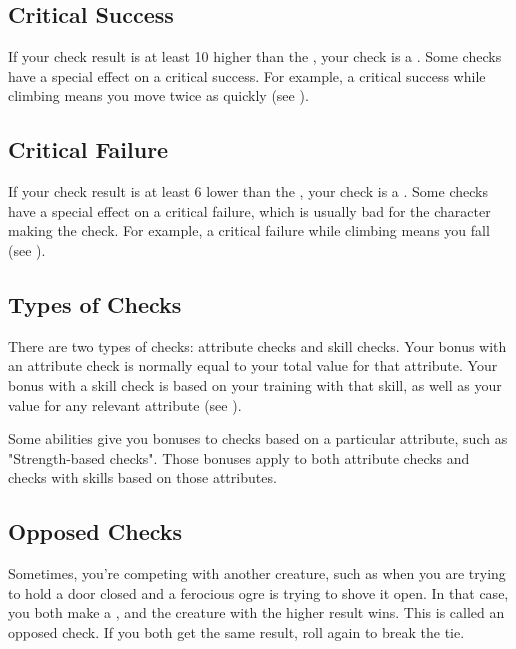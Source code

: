     \subsection{Critical Success}
        If your check result is at least 10 higher than the , your check is a .
        Some checks have a special effect on a critical success.
        For example, a critical success while climbing means you move twice as quickly (see ).

    \subsection{Critical Failure}
        If your check result is at least 6 lower than the , your check is a .
        Some checks have a special effect on a critical failure, which is usually bad for the character making the check.
        For example, a critical failure while climbing means you fall (see ).

    \subsection{Types of Checks}
        There are two types of checks: attribute checks and skill checks.
        Your bonus with an attribute check is normally equal to your total value for that attribute.
        Your bonus with a skill check is based on your training with that skill, as well as your value for any relevant attribute (see ).

        Some abilities give you bonuses to checks based on a particular attribute, such as "Strength-based checks".
        Those bonuses apply to both attribute checks and checks with skills based on those attributes.

    \subsection{Opposed Checks}
        Sometimes, you're competing with another creature, such as when you are trying to hold a door closed and a ferocious ogre is trying to shove it open.
        In that case, you both make a , and the creature with the higher result wins.
        This is called an opposed check.
        If you both get the same result, roll again to break the tie.

